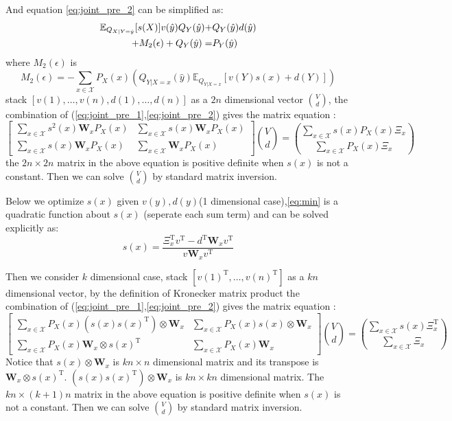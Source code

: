 \documentclass{article}
\def\T{\mathrm{T}}
\def\E{\mathbb{E}}
\begin{document}
And equation \eqref{eq:joint_pre_2} can be simplified as:
\begin{align}\notag
\E_{Q_{X|Y=\hat{y}}}[s(X)]v(\hat{y})Q_Y(\hat{y})+&Q_Y(\hat{y})d(\hat{y}) \\
+M_2(\epsilon)+Q_Y(\hat{y})=& P_Y(\hat{y})\label{eq:joint_simplify_2}
\end{align}
where $M_2(\epsilon)$ is
$$
M_2(\epsilon)=-\sum_{x\in \mathcal{X}}P_X(x)\left(Q_{Y|X=x}(\hat{y})\E_{Q_{Y|X=x}}[v(Y)s(x)+d(Y)]\right)
$$
stack $[v(1),\dots,v(n),d(1),\dots,d(n)]$ as a $2n$ dimensional vector $\binom{V}{d}$, the combination of (\ref{eq:joint_pre_1},\ref{eq:joint_pre_2}) gives
the matrix equation :
\begin{equation}\label{eq:MVd}
\begin{bmatrix}
\sum_{x\in \mathcal{X}} s^2(x)\bm{W}_xP_X(x) & \sum_{x\in \mathcal{X}} s(x)\bm{W}_xP_X(x) \\
\sum_{x\in \mathcal{X}} s(x)\bm{W}_xP_X(x) & \sum_{x\in \mathcal{X}} \bm{W}_xP_X(x)
\end{bmatrix}\binom{V}{d}=\binom{\sum_{x\in \mathcal{X}}s(x)P_X(x)\Xi_x}{\sum_{x\in \mathcal{X}}P_X(x)\Xi_x}
\end{equation}
the $2n\times 2n$ matrix in the above equation is positive definite when $s(x)$ is not a constant. Then we can solve $\binom{V}{d}$ by standard matrix inversion.

Below we optimize $s(x)$ given $v(y),d(y)$(1 dimensional case),\eqref{eq:min} is a quadratic function about $s(x)$ (seperate each sum term) and can be solved
explicitly as:
\begin{equation}
s(x)=\frac{\Xi_x^\T v^\T -d^\T \bm{W}_x v^\T}{v\bm{W}_xv^\T}
\end{equation}

Then we consider $k$ dimensional case, stack $[v(1)^\T,\dots,v(n)^\T]$ as a $kn$ dimensional vector, by the definition of Kronecker matrix product 
the combination of (\ref{eq:joint_pre_1},\ref{eq:joint_pre_2}) gives
the matrix equation :
\begin{equation}
\begin{bmatrix}
\sum_{x\in \mathcal{X}} P_X(x) (s(x)s(x)^\T)\otimes \bm{W}_x & \sum_{x\in \mathcal{X}} P_X(x) s(x)\otimes \bm{W}_x \\
\sum_{x\in \mathcal{X}} P_X(x) \bm{W}_x\otimes s(x)^\T & \sum_{x\in \mathcal{X}} P_X(x)\bm{W}_x
\end{bmatrix}\binom{V}{d}=\binom{\sum_{x\in \mathcal{X}}s(x)\Xi_x^\T}{\sum_{x\in \mathcal{X}}\Xi_x}
\end{equation}
Notice that $s(x)\otimes \bm{W}_x$ is $kn\times n$ dimensional matrix and its transpose is $\bm{W}_x \otimes s(x)^\T$.
$(s(x)s(x)^\T)\otimes \bm{W}_x$ is $kn \times kn$ dimensional matrix.
The $kn\times (k+1)n$ matrix in the above equation is positive definite when $s(x)$ is not a constant. Then we can solve $\binom{V}{d}$ by standard matrix inversion.
\end{document}
